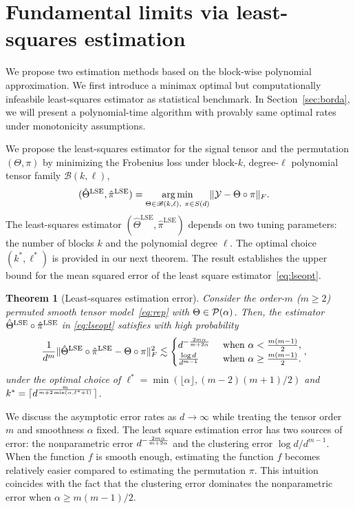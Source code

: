 \documentclass{article}
\newtheorem{thm}{Theorem}
\theoremstyle{definition}
\def\caliB{\mathscr{B}}
\begin{document}
\vspace{-.3cm}
\section{Fundamental limits via least-squares estimation}\label{sec:lse}
\vspace{-.3cm}
We propose two estimation methods based on the block-wise polynomial approximation. We first introduce a minimax optimal but computationally infeasbile least-squares estimator as statistical benchmark. In Section~\ref{sec:borda}, we will present a polynomial-time algorithm with provably same optimal rates under monotonicity assumptions.

We propose the least-squares estimator for the signal tensor and the permutation $(\Theta,\pi)$ by minimizing the Frobenius loss under block-$k$, degree-$\ell$ polynomial tensor family $\caliB(k,\ell)$, 
\begin{align}\label{eq:lseopt}
    (\hat\Theta^{\text{LSE}},\hat \pi^{\text{LSE}}) &= \argmin_{\Theta\in\caliB(k,\ell), \  \pi\in S(d)}\FnormSize{}{\tY-\Theta\circ\pi}.
\end{align}
The least-squares estimator $(\hat\Theta^{\text{LSE}},\hat\pi^{\text{LSE}})$ depends on two tuning parameters: the number of blocks $k$ and the polynomial degree $\ell$. The optimal choice $(k^*,\ell^*)$ is provided in our next theorem. The result establishes the upper bound for the mean squared error of the least square estimator~\eqref{eq:lseopt}. 
\begin{thm}[Least-squares estimation error]\label{thm:LSE} 
Consider the order-$m$ ($m\geq 2$) permuted smooth tensor model~\eqref{eq:rep} with $\Theta\in\mathcal{P}(\alpha)$.
Then, the estimator $\hat\Theta^{\textup{LSE}}\circ\hat\pi^{\textup{LSE}}$  in \eqref{eq:lseopt} satisfies with high probability 
\begin{align}\label{eq:rates}
   \frac{1}{d^m}&\lVert\hat\Theta^{\textup{LSE}}\circ\hat\pi^{\textup{LSE}}-\Theta\circ \pi\rVert_F^2\lesssim  \begin{cases}d^{-{2m\alpha\over m+2\alpha}} & \text{ when } \alpha < \frac{m(m-1)}{2},\\{\log d\over d^{m-1}}&\text{ when } \alpha \geq \frac{m(m-1)}{2}.\end{cases},
\end{align}
under the optimal choice of $\ell^* = \min(\lfloor\alpha\rfloor,(m-2)(m+1)/2)$ and $k^* = \lceil d^{m\over m+2\min(\alpha,\ell^*+1)}\rceil$.
\end{thm}
We discuss the asymptotic error rates as $d\rightarrow \infty$ while treating the tensor order $m$ and smoothness $\alpha$ fixed. 
The least square estimation error has two sources of error: the nonparametric error $d^{-{2m\alpha\over m+2\alpha}}$ and the clustering error $\log d/d^{m-1}$.  When the function $f$ is smooth enough, estimating the function $f$ becomes relatively easier compared to estimating the permutation $\pi$. This intuition coincides with the fact that the clustering error dominates the nonparametric error when  $\alpha\geq m(m-1)/2$. 
\end{document}
